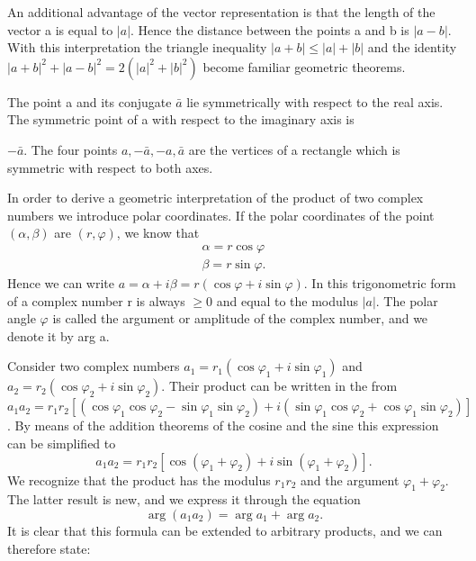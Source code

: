 An additional advantage of the vector representation is that the length of the vector a is equal to $|a|$. Hence the distance between the points a and b is $|a - b|$. With this interpretation the triangle inequality $|a + b| \leq |a| + |b|$ and the identity $|a + b|^{2} + |a - b|^{2} = 2(|a|^{2} + |b|^{2})$ become familiar geometric theorems.

The point a and its conjugate $\bar{a}$ lie symmetrically with respect to the real axis. The symmetric point of a with respect to the imaginary axis is


$-\bar{a}$. The four points $a, -\bar{a}, -a, \bar{a}$ are the vertices of a rectangle which is symmetric with respect to both axes.

In order to derive a geometric interpretation of the product of two complex numbers we introduce polar coordinates. If the polar coordinates of the point $(\alpha,\beta)$ are $(r,\varphi)$, we know that
\begin{equation*}
\begin{array}{l} \alpha = r \cos \varphi \\ \beta = r \sin \varphi . \end{array}
\end{equation*}
Hence we can write $a = \alpha + i\beta = r(\cos \varphi + i \sin \varphi)$. In this trigonometric form of a complex number r is always $\geq 0$ and equal to the modulus $|a|$. The polar angle $\varphi$ is called the argument or amplitude of the complex number, and we denote it by arg a.

Consider two complex numbers $a_{1}=r_{1}(\cos\varphi_{1}+i\sin\varphi_{1})$ and $a_{2}=r_{2}(\cos\varphi_{2}+i\sin\varphi_{2})$. Their product can be written in the from $a_{1}a_{2}=r_{1}r_{2}[(\cos\varphi_{1}\cos\varphi_{2}-\sin\varphi_{1}\sin\varphi_{2})+i(\sin\varphi_{1}\cos\varphi_{2}+\cos\varphi_{1}\sin\varphi_{2})]$. By means of the addition theorems of the cosine and the sine this expression can be simplified to
\begin{equation*}
a _ {1} a _ {2} = r _ {1} r _ {2} \left[ \cos \left(\varphi_ {1} + \varphi_ {2}\right) + i \sin \left(\varphi_ {1} + \varphi_ {2}\right) \right].\tag{16}\label{eq:1.16}
\end{equation*}
We recognize that the product has the modulus $r_{1}r_{2}$ and the argument $\varphi_{1} + \varphi_{2}$. The latter result is new, and we express it through the equation
\begin{equation*}
\arg \left(a _ {1} a _ {2}\right) = \arg a _ {1} + \arg a _ {2}.\tag{17}\label{eq:1.17}
\end{equation*}
It is clear that this formula can be extended to arbitrary products, and we can therefore state:


